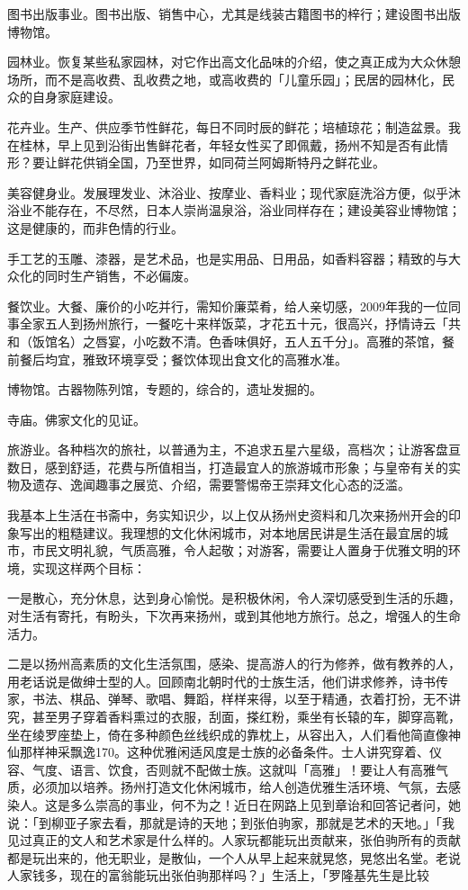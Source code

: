 图书出版事业。图书出版、销售中心，尤其是线装古籍图书的梓行；建设图书出版博物馆。

园林业。恢复某些私家园林，对它作出高文化品味的介绍，使之真正成为大众休憩场所，而不是高收费、乱收费之地，或高收费的「儿童乐园」；民居的园林化，民众的自身家庭建设。

花卉业。生产、供应季节性鲜花，每日不同时辰的鲜花；培植琼花；制造盆景。我在桂林，早上见到沿街出售鲜花者，年轻女性买了即佩戴，扬州不知是否有此情形？要让鲜花供销全国，乃至世界，如同荷兰阿姆斯特丹之鲜花业。

美容健身业。发展理发业、沐浴业、按摩业、香料业；现代家庭洗浴方便，似乎沐浴业不能存在，不尽然，日本人崇尚温泉浴，浴业同样存在；建设美容业博物馆；这是健康的，而非色情的行业。

手工艺的玉雕、漆器，是艺术品，也是实用品、日用品，如香料容器；精致的与大众化的同时生产销售，不必偏废。

餐饮业。大餐、廉价的小吃并行，需知价廉菜肴，给人亲切感，2009年我的一位同事全家五人到扬州旅行，一餐吃十来样饭菜，才花五十元，很高兴，抒情诗云「共和（饭馆名）之唇宴，小吃数不清。色香味俱好，五人五千分」。高雅的茶馆，餐前餐后均宜，雅致环境享受；餐饮体现出食文化的高雅水准。


博物馆。古器物陈列馆，专题的，综合的，遗址发掘的。

寺庙。佛家文化的见证。

旅游业。各种档次的旅社，以普通为主，不追求五星六星级，高档次；让游客盘亘数日，感到舒适，花费与所值相当，打造最宜人的旅游城市形象；与皇帝有关的实物及遗存、逸闻趣事之展览、介绍，需要警惕帝王崇拜文化心态的泛滥。

我基本上生活在书斋中，务实知识少，以上仅从扬州史资料和几次来扬州开会的印象写出的粗糙建议。我理想的文化休闲城市，对本地居民讲是生活在最宜居的城市，市民文明礼貌，气质高雅，令人起敬；对游客，需要让人置身于优雅文明的环境，实现这样两个目标：

一是散心，充分休息，达到身心愉悦。是积极休闲，令人深切感受到生活的乐趣，对生活有寄托，有盼头，下次再来扬州，或到其他地方旅行。总之，增强人的生命活力。

二是以扬州高素质的文化生活氛围，感染、提高游人的行为修养，做有教养的人，用老话说是做绅士型的人。回顾南北朝时代的士族生活，他们讲求修养，诗书传家，书法、棋品、弹琴、歌唱、舞蹈，样样来得，以至于精通，衣着打扮，无不讲究，甚至男子穿着香料熏过的衣服，刮面，搽红粉，乘坐有长辕的车，脚穿高靴，坐在绫罗座垫上，倚在多种颜色丝线织成的靠枕上，从容出入，人们看他简直像神仙那样神采飘逸170。这种优雅闲适风度是士族的必备条件。士人讲究穿着、仪容、气度、语言、饮食，否则就不配做士族。这就叫「高雅」！要让人有高雅气质，必须加以培养。扬州打造文化休闲城市，给人创造优雅生活环境、气氛，去感染人。这是多么崇高的事业，何不为之！近日在网路上见到章诒和回答记者问，她说：「到柳亚子家去看，那就是诗的天地；到张伯驹家，那就是艺术的天地。」「我见过真正的文人和艺术家是什么样的。人家玩都能玩出贡献来，张伯驹所有的贡献都是玩出来的，他无职业，是散仙，一个人从早上起来就晃悠，晃悠出名堂。老说人家钱多，现在的富翁能玩出张伯驹那样吗？」生活上，「罗隆基先生是比较

